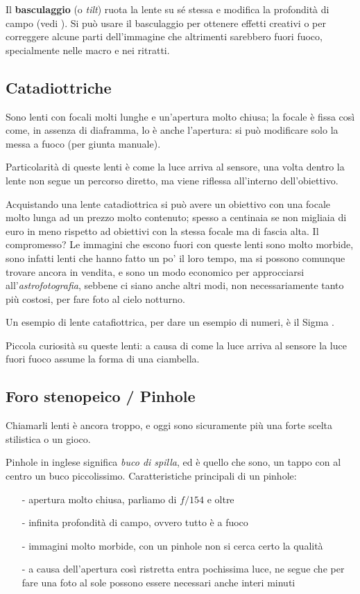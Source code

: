 Il \textbf{basculaggio} (o \textit{tilt}) ruota la lente su sé stessa e modifica la profondità di campo (vedi ).
Si può usare il basculaggio per ottenere effetti creativi o per correggere alcune parti dell'immagine che altrimenti sarebbero fuori fuoco, specialmente nelle macro e nei ritratti.


\subsection{Catadiottriche} \label{subsec:lenticatadiottriche}
Sono lenti con focali molti lunghe e un'apertura molto chiusa; la focale è fissa così come, in assenza di diaframma, lo è anche l'apertura: si può modificare solo la messa a fuoco (per giunta manuale).

Particolarità di queste lenti è come la luce arriva al sensore, una volta dentro la lente non segue un percorso diretto, ma viene riflessa all'interno dell'obiettivo.

Acquistando una lente catadiottrica si può avere un obiettivo con una focale molto lunga ad un prezzo molto contenuto; spesso a centinaia se non migliaia di euro in meno rispetto ad obiettivi con la stessa focale ma di fascia alta.
Il compromesso? Le immagini che escono fuori con queste lenti sono molto morbide, sono infatti lenti che hanno fatto un po' il loro tempo, ma si possono comunque trovare ancora in vendita, e sono un modo economico per approcciarsi all'\textit{astrofotografia}, sebbene ci siano anche altri modi, non necessariamente tanto più costosi, per fare foto al cielo notturno.

Un esempio di lente catafiottrica, per dare un esempio di numeri, è il Sigma .

Piccola curiosità su queste lenti: a causa di come la luce arriva al sensore la luce fuori fuoco assume la forma di una ciambella.


\subsection{Foro stenopeico / Pinhole} \label{subsec:lentipinhole}
Chiamarli lenti è ancora troppo, e oggi sono sicuramente più una forte scelta stilistica o un gioco.

Pinhole in inglese significa \textit{buco di spilla}, ed è quello che sono, un tappo con al centro un buco piccolissimo.\newline
Caratteristiche principali di un pinhole:
\begin{itemize}
    \item[-] apertura molto chiusa, parliamo di $f/154$ e oltre
    \item[-] infinita profondità di campo, ovvero tutto è a fuoco
    \item[-] immagini molto morbide, con un pinhole non si cerca certo la qualità
    \item[-] a causa dell'apertura così ristretta entra pochissima luce, ne segue che per fare una foto al sole possono essere necessari anche interi minuti   
\end{itemize}

